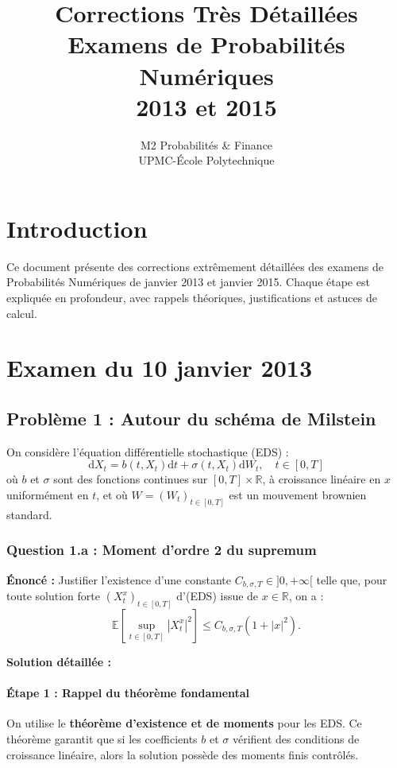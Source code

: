 \documentclass[12pt,a4paper]{article}
\title{\textbf{Corrections Très Détaillées} \\ Examens de Probabilités Numériques \\ 2013 et 2015}
\author{M2 Probabilités \& Finance \\ UPMC-École Polytechnique}
\date{}
\theoremstyle{definition}
\theoremstyle{remark}
\newcommand{\R}{\mathbb{R}}
\newcommand{\E}{\mathbb{E}}
\newcommand{\dd}{\mathrm{d}}
\newcommand{\supt}[1]{\sup_{t \in #1}}
\begin{document}
\maketitle

\tableofcontents
\newpage

\section*{Introduction}
Ce document présente des corrections extrêmement détaillées des examens de Probabilités Numériques de janvier 2013 et janvier 2015. Chaque étape est expliquée en profondeur, avec rappels théoriques, justifications et astuces de calcul.

\newpage
\section{Examen du 10 janvier 2013}

\subsection{Problème 1 : Autour du schéma de Milstein}

On considère l'équation différentielle stochastique (EDS) :
\begin{equation}
\dd X_t = b(t, X_t)\dd t + \sigma(t, X_t)\dd W_t, \quad t \in [0,T]
\end{equation}
où $b$ et $\sigma$ sont des fonctions continues sur $[0,T] \times \R$, à croissance linéaire en $x$ uniformément en $t$, et où $W = (W_t)_{t \in [0,T]}$ est un mouvement brownien standard.

\subsubsection{Question 1.a : Moment d'ordre 2 du supremum}

\textbf{Énoncé :} Justifier l'existence d'une constante $C_{b,\sigma,T} \in ]0, +\infty[$ telle que, pour toute solution forte $(X_t^x)_{t \in [0,T]}$ d'(EDS) issue de $x \in \R$, on a :
\[
\E\left[\supt{[0,T]} |X_t^x|^2\right] \leq C_{b,\sigma,T}(1 + |x|^2).
\]

\textbf{Solution détaillée :}

\paragraph{Étape 1 : Rappel du théorème fondamental}
On utilise le \textbf{théorème d'existence et de moments} pour les EDS. Ce théorème garantit que si les coefficients $b$ et $\sigma$ vérifient des conditions de croissance linéaire, alors la solution possède des moments finis contrôlés.
\end{document}
